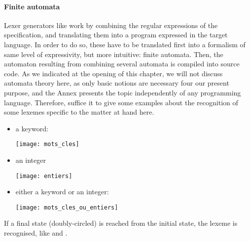 \paragraph{Finite automata}

Lexer generators like \ocamllex work by combining the regular
expressions of the specification, and translating them into a program
expressed in the target language. In order to do so, these have to be
translated first into a formalism of same level of expressivity, but
more intuitive: finite automata. Then, the automaton resulting from
combining several automata is compiled into source code. As we
indicated at the opening of this chapter, we will not discuss automata
theory here, as only basic notions are necessary four our present
purpose, and the Annex presents the topic independently of any
programming language. Therefore, suffice it to give some examples
about the recognition of some lexemes specific to the matter at hand
here.
\begin{itemize}

   \item a keyword:
     \begin{center}
       \texttt{[image: mots\_cles]}
     \end{center}

  \item an integer
    \begin{center}
      \texttt{[image: entiers]}
    \end{center}

  \item either a keyword or an integer:
    \begin{center}
      \texttt{[image: mots\_cles\_ou\_entiers]}
    \end{center}

\end{itemize}
If a final state (doubly\hyp{}circled) is reached from the initial
state, the lexeme is recognised, like \Tlet and \Tint.

